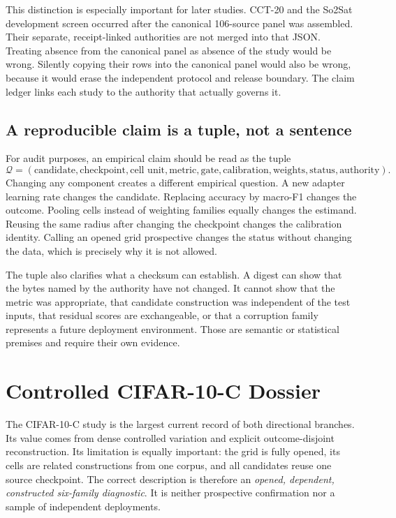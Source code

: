 This distinction is especially important for later studies.  CCT-20 and the So2Sat development
screen occurred after the canonical 106-source panel was assembled.  Their separate, receipt-linked
authorities are not merged into that JSON.  Treating absence from the canonical panel as absence of
the study would be wrong.  Silently copying their rows into the canonical panel would also be wrong,
because it would erase the independent protocol and release boundary.  The claim ledger links each
study to the authority that actually governs it.

\subsection{A reproducible claim is a tuple, not a sentence}
\label{fr:sec-claim-tuple}

For audit purposes, an empirical claim should be read as the tuple
\begin{equation}
  \mathcal Q=(\text{candidate},\text{checkpoint},\text{cell unit},\text{metric},
  \text{gate},\text{calibration},\text{weights},\text{status},\text{authority}).
\label{fr:eq-claim-tuple}
\end{equation}
Changing any component creates a different empirical question.  A new adapter learning rate
changes the candidate.  Replacing accuracy by macro-F1 changes the outcome.  Pooling cells instead
of weighting families equally changes the estimand.  Reusing the same radius after changing the
checkpoint changes the calibration identity.  Calling an opened grid prospective changes the
status without changing the data, which is precisely why it is not allowed.

The tuple also clarifies what a checksum can establish.  A digest can show that the bytes named by
the authority have not changed.  It cannot show that the metric was appropriate, that candidate
construction was independent of the test inputs, that residual scores are exchangeable, or that a
corruption family represents a future deployment environment.  Those are semantic or statistical
premises and require their own evidence.

\section{Controlled CIFAR-10-C Dossier}
\label{fr:sec-cifar-dossier}

The CIFAR-10-C study is the largest current record of both directional branches.  Its value comes
from dense controlled variation and explicit outcome-disjoint reconstruction.  Its limitation is
equally important: the grid is fully opened, its cells are related constructions from one corpus,
and all candidates reuse one source checkpoint.  The correct description is therefore an
\emph{opened, dependent, constructed six-family diagnostic}.  It is neither prospective
confirmation nor a sample of independent deployments.

